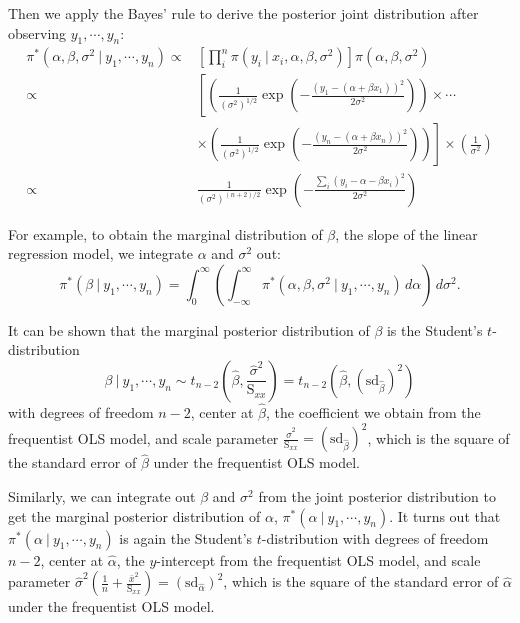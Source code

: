 \documentclass[]{book}
\theoremstyle{definition}
\theoremstyle{definition}
\theoremstyle{definition}
\theoremstyle{remark}
\begin{document}
Then we apply the Bayes' rule to derive the posterior joint distribution
after observing \(y_1,\cdots, y_n\): \[
\begin{aligned}
\pi^*(\alpha, \beta, \sigma^2~|~y_1,\cdots,y_n) \propto & \left[\prod_i^n\pi(y_i~|~x_i,\alpha,\beta,\sigma^2)\right]\pi(\alpha, \beta,\sigma^2) \\
\propto & \left[\left(\frac{1}{(\sigma^2)^{1/2}}\exp\left(-\frac{(y_1-(\alpha+\beta x_1 ))^2}{2\sigma^2}\right)\right)\times\cdots \right.\\
& \left. \times \left(\frac{1}{(\sigma^2)^{1/2}}\exp\left(-\frac{(y_n-(\alpha +\beta x_n))^2}{2\sigma^2}\right)\right)\right]\times\left(\frac{1}{\sigma^2}\right)\\
\propto & \frac{1}{(\sigma^2)^{(n+2)/2}}\exp\left(-\frac{\sum_i\left(y_i-\alpha-\beta  x_i\right)^2}{2\sigma^2}\right)
\end{aligned}
\]

For example, to obtain the marginal distribution of \(\beta\), the slope
of the linear regression model, we integrate \(\alpha\) and \(\sigma^2\)
out:
\[ \pi^*(\beta~|~y_1,\cdots,y_n) = \int_0^\infty \left(\int_{-\infty}^\infty \pi^*(\alpha, \beta, \sigma^2~|~y_1,\cdots, y_n)\, d\alpha\right)\, d\sigma^2. \]

It can be shown that the marginal posterior distribution of \(\beta\) is
the Student's \(t\)-distribution
\[ \beta~|~y_1,\cdots,y_n \sim t_{n-2}\left(\hat{\beta}, \frac{\hat{\sigma}^2}{\text{S}_{xx}}\right) = t_{n-2}\left(\hat{\beta}, (\text{sd}_{\hat{\beta}})^2\right) \]
with degrees of freedom \(n-2\), center at \(\hat{\beta}\), the
coefficient we obtain from the frequentist OLS model, and scale
parameter
\(\displaystyle \frac{\hat{\sigma}^2}{\text{S}_{xx}}=\left(\text{sd}_{\hat{\beta}}\right)^2\),
which is the square of the standard error of \(\hat{\beta}\) under the
frequentist OLS model.

Similarly, we can integrate out \(\beta\) and \(\sigma^2\) from the
joint posterior distribution to get the marginal posterior distribution
of \(\alpha\), \(\pi^*(\alpha~|~y_1,\cdots, y_n)\). It turns out that
\(\pi^*(\alpha~|~y_1,\cdots,y_n)\) is again the Student's
\(t\)-distribution with degrees of freedom \(n-2\), center at
\(\hat{\alpha}\), the \(y\)-intercept from the frequentist OLS model,
and scale parameter
\(\displaystyle \hat{\sigma}^2\left(\frac{1}{n}+\frac{\bar{x}^2}{\text{S}_{xx}}\right) = \left(\text{sd}_{\hat{\alpha}}\right)^2\),
which is the square of the standard error of \(\hat{\alpha}\) under the
frequentist OLS model.
\end{document}
